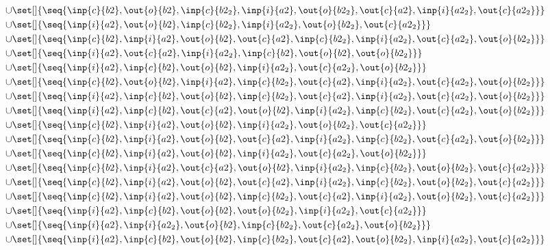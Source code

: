 \begin{align*}
\cup&\set[]{\seq{\inp{c}{b2},\out{o}{b2},\inp{c}{b2_2},\inp{i}{a2},\out{o}{b2_2},\out{c}{a2},\inp{i}{a2_2},\out{c}{a2_2}}}\\
\cup&\set[]{\seq{\inp{i}{a2},\out{o}{b2},\inp{c}{b2_2},\inp{i}{a2_2},\out{o}{b2_2},\out{c}{a2_2}}}\\
\cup&\set[]{\seq{\inp{c}{b2},\inp{i}{a2},\out{o}{b2},\out{c}{a2},\inp{c}{b2_2},\inp{i}{a2_2},\out{c}{a2_2},\out{o}{b2_2}}}\\
\cup&\set[]{\seq{\inp{i}{a2},\out{c}{a2},\inp{i}{a2_2},\inp{c}{b2},\out{o}{b2},\out{o}{b2_2}}}\\
\cup&\set[]{\seq{\inp{i}{a2},\inp{c}{b2},\out{o}{b2},\inp{i}{a2_2},\out{c}{a2_2},\out{o}{b2_2}}}\\
\cup&\set[]{\seq{\inp{c}{b2},\out{o}{b2},\inp{i}{a2},\inp{c}{b2_2},\out{c}{a2},\inp{i}{a2_2},\out{c}{a2_2},\out{o}{b2_2}}}\\
\cup&\set[]{\seq{\inp{i}{a2},\inp{c}{b2},\out{o}{b2},\inp{c}{b2_2},\out{c}{a2},\inp{i}{a2_2},\out{c}{a2_2},\out{o}{b2_2}}}\\
\cup&\set[]{\seq{\inp{i}{a2},\inp{c}{b2},\out{c}{a2},\out{o}{b2},\inp{i}{a2_2},\inp{c}{b2_2},\out{c}{a2_2},\out{o}{b2_2}}}\\
\cup&\set[]{\seq{\inp{c}{b2},\inp{i}{a2},\out{o}{b2},\inp{i}{a2_2},\out{o}{b2_2},\out{c}{a2_2}}}\\
\cup&\set[]{\seq{\inp{c}{b2},\inp{i}{a2},\out{o}{b2},\out{c}{a2},\inp{i}{a2_2},\inp{c}{b2_2},\out{c}{a2_2},\out{o}{b2_2}}}\\
\cup&\set[]{\seq{\inp{c}{b2},\inp{i}{a2},\out{o}{b2},\inp{i}{a2_2},\out{c}{a2_2},\out{o}{b2_2}}}\\
\cup&\set[]{\seq{\inp{c}{b2},\inp{i}{a2},\out{c}{a2},\out{o}{b2},\inp{i}{a2_2},\inp{c}{b2_2},\out{o}{b2_2},\out{c}{a2_2}}}\\
\cup&\set[]{\seq{\inp{c}{b2},\inp{i}{a2},\out{o}{b2},\out{c}{a2},\inp{i}{a2_2},\inp{c}{b2_2},\out{o}{b2_2},\out{c}{a2_2}}}\\
\cup&\set[]{\seq{\inp{c}{b2},\inp{i}{a2},\out{o}{b2},\inp{c}{b2_2},\out{c}{a2},\inp{i}{a2_2},\out{o}{b2_2},\out{c}{a2_2}}}\\
\cup&\set[]{\seq{\inp{i}{a2},\inp{c}{b2},\out{o}{b2},\out{o}{b2_2},\inp{i}{a2_2},\out{c}{a2_2}}}\\
\cup&\set[]{\seq{\inp{i}{a2},\inp{i}{a2_2},\out{o}{b2},\inp{c}{b2_2},\out{c}{a2_2},\out{o}{b2_2}}}\\
\cup&\set[]{\seq{\inp{i}{a2},\inp{c}{b2},\out{o}{b2},\inp{c}{b2_2},\out{c}{a2},\out{o}{b2_2},\inp{i}{a2_2},\out{c}{a2_2}}}\\

\end{align*}
